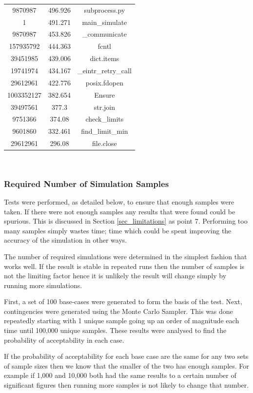 \documentclass[a4paper,oneside,12pt]{report}
\begin{document}
\begin{table}[htbp]
\begin{tabular}{c||c||c}
9870987  &  496.926  &  subprocess.py  \\ 
1  &  491.271  &  main\_simulate  \\ 
9870987  &  453.826  &  \_communicate  \\ 
157935792  &  444.363  &  fcntl  \\ 
39451985  &  439.006  &  dict.items  \\ 
19741974  &  434.167  &  \_eintr\_retry\_call  \\ 
29612961  &  422.776  &  posix.fdopen  \\ 
1003352127  &  382.654  &  Ensure  \\ 
39497561  &  377.3  &  str.join  \\ 
9751366  &  374.08  &  check\_limits  \\ 
9601860  &  332.461  &  find\_limit\_min  \\ 
29612961  &  296.08  &  file.close  \\ 
\hline
\end{tabular}\\
\end{table}

\subsubsection{Required Number of Simulation Samples}

Tests were performed, as detailed below, to ensure that enough samples
were taken. If there were not enough samples any results that were found
could be spurious. This is discussed in Section \ref{sec_limitations} as point 7.
Performing too many samples simply wastes time; time which could be spent improving the accuracy of the simulation in other ways.

The number of required simulations were determined in the simplest fashion that
works well. If the result is stable in repeated runs then the number of
samples is not the limiting factor hence it is unlikely
the result will change simply by running more
simulations.

First, a set of 100 base-cases were generated to form the basis of the
test. Next, contingencies were generated using the Monte Carlo Sampler.
This was done repeatedly starting with 1 unique sample going up an
order of magnitude each time until 100,000 unique samples. These
results were analysed to find the probability of acceptability in each
case.

If the probability of acceptability for each base case are the same for
any two sets of sample sizes then we know that the smaller of the two
has enough samples. For example if 1,000 and 10,000 both had the same
results to a certain number of significant figures then running more
samples is not likely to change that number.
\end{document}
